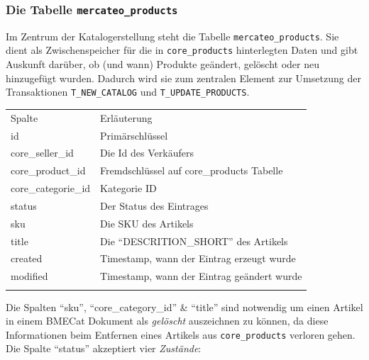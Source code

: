 	\subsubsection{Die Tabelle \texttt{mercateo\_products}}

	Im Zentrum der Katalogerstellung steht die Tabelle \texttt{mercateo\_products}. Sie dient als Zwischenspeicher für die in \texttt{core\_products} hinterlegten Daten und gibt Auskunft darüber, ob (und wann) Produkte geändert, gelöscht oder neu hinzugefügt wurden. Dadurch wird sie zum zentralen Element zur Umsetzung der Transaktionen \texttt{T\_NEW\_CATALOG} und \texttt{T\_UPDATE\_PRODUCTS}. 
	
	\begin{table}[!htbp]
		\begin{tabularx}{\textwidth}{p{4cm} X}
		\rowcolor[HTML]{EFEFEF} 
		Spalte & Erläuterung \\ \cline{1-2} \addlinespace[7pt]
		id & Primärschlüssel \\
		core\_seller\_id & Die Id des Verkäufers \\
		core\_product\_id & Fremdschlüssel auf core\_products Tabelle \\
		core\_categorie\_id & Kategorie ID  \\
		status & Der Status des Eintrages \\
		sku & Die SKU des Artikels \\
		title & Die \enquote{DESCRITION\_SHORT} des Artikels  \\ 
		created & Timestamp, wann der Eintrag erzeugt wurde  \\
		modified & Timestamp, wann der Eintrag geändert wurde  \\\addlinespace[7pt] \cline{1-2} 
		\end{tabularx}%
	\end{table}
	
	Die Spalten \enquote{sku}, \enquote{core\_category\_id} \& \enquote{title} sind notwendig um einen Artikel in einem BMECat Dokument als \textit{gelöscht} auszeichnen zu können, da diese Informationen beim Entfernen eines Artikels aus \texttt{core\_products} verloren gehen. Die Spalte \enquote{status} akzeptiert vier \textit{Zustände}: 
	
